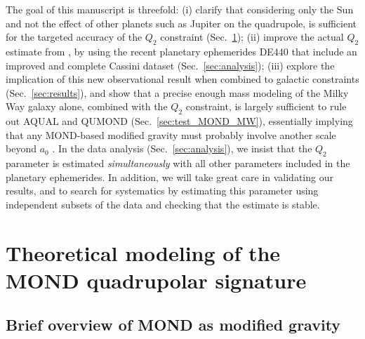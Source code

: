 \documentclass[reprint,nofootinbib,prd,aps]{revtex4-2}
\begin{document}
The goal of this manuscript is threefold: (i) clarify that considering only the Sun and not the effect of other planets such as Jupiter on the quadrupole, is sufficient for the targeted accuracy of the $Q_2$ constraint (Sec.~\ref{sec:theory}); (ii) improve the actual $Q_2$ estimate from \cite{hees_2014}, by using the recent planetary ephemerides DE440 \cite{park_2021} that include an improved and complete Cassini dataset (Sec.~\ref{sec:analysis}); (iii) explore the implication of this new observational result when combined to galactic constraints (Sec.~\ref{sec:results}), and show that a precise enough mass modeling of the Milky Way galaxy alone, combined with the $Q_2$ constraint, is largely sufficient to rule out AQUAL and QUMOND (Sec.~\ref{sec:test_MOND_MW}), essentially implying that any MOND-based modified gravity must probably involve another scale beyond $a_0$ \cite{GQUMOND}. In the data analysis (Sec.~\ref{sec:analysis}), we insist that the $Q_2$ parameter is estimated {\it simultaneously} with all other parameters included in the planetary ephemerides. In addition, we will take great care in validating our results, and to search for systematics by estimating this parameter using independent subsets of the data and checking that the estimate is stable.



\section{Theoretical modeling of the MOND quadrupolar signature}
\label{sec:theory}

\subsection{Brief overview of MOND as modified gravity}
\end{document}
